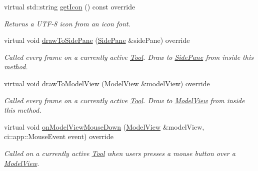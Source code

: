 \begin{DoxyCompactItemize}
virtual std\+::string \mbox{\hyperlink{classpepr3d_1_1_triangle_painter_a4c63bae3ec3f2d909ea4f4ae1fa61d33}{get\+Icon}} () const override
\begin{DoxyCompactList}\small\item\em Returns a U\+T\+F-\/8 icon from an icon font. \end{DoxyCompactList}\item 
\mbox{\label{classpepr3d_1_1_triangle_painter_a75abd7d20eaf815b3f17973e78300953}} 
virtual void \mbox{\hyperlink{classpepr3d_1_1_triangle_painter_a75abd7d20eaf815b3f17973e78300953}{draw\+To\+Side\+Pane}} (\mbox{\hyperlink{classpepr3d_1_1_side_pane}{Side\+Pane}} \&side\+Pane) override
\begin{DoxyCompactList}\small\item\em Called every frame on a currently active \mbox{\hyperlink{classpepr3d_1_1_tool}{Tool}}. Draw to \mbox{\hyperlink{classpepr3d_1_1_side_pane}{Side\+Pane}} from inside this method. \end{DoxyCompactList}\item 
\mbox{\label{classpepr3d_1_1_triangle_painter_a2a2a26bd5c33bc504014f9fcf9dbcae6}} 
virtual void \mbox{\hyperlink{classpepr3d_1_1_triangle_painter_a2a2a26bd5c33bc504014f9fcf9dbcae6}{draw\+To\+Model\+View}} (\mbox{\hyperlink{classpepr3d_1_1_model_view}{Model\+View}} \&model\+View) override
\begin{DoxyCompactList}\small\item\em Called every frame on a currently active \mbox{\hyperlink{classpepr3d_1_1_tool}{Tool}}. Draw to \mbox{\hyperlink{classpepr3d_1_1_model_view}{Model\+View}} from inside this method. \end{DoxyCompactList}\item 
\mbox{\label{classpepr3d_1_1_triangle_painter_ada0494fd30bbdbf789cb4fa5ac980a9d}} 
virtual void \mbox{\hyperlink{classpepr3d_1_1_triangle_painter_ada0494fd30bbdbf789cb4fa5ac980a9d}{on\+Model\+View\+Mouse\+Down}} (\mbox{\hyperlink{classpepr3d_1_1_model_view}{Model\+View}} \&model\+View, ci\+::app\+::\+Mouse\+Event event) override
\begin{DoxyCompactList}\small\item\em Called on a currently active \mbox{\hyperlink{classpepr3d_1_1_tool}{Tool}} when users presses a mouse button over a \mbox{\hyperlink{classpepr3d_1_1_model_view}{Model\+View}}. \end{DoxyCompactList}\item 

\end{DoxyCompactItemize}

